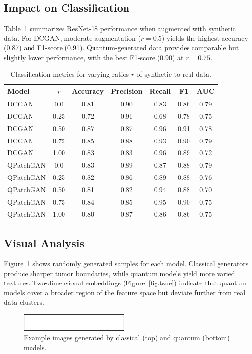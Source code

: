 \documentclass[pdflatex,sn-mathphys-num]{sn-jnl}
\theoremstyle{thmstyleone}
\theoremstyle{thmstyletwo}
\theoremstyle{thmstylethree}
\begin{document}
\subsection{Impact on Classification}
Table~\ref{tab:classification} summarizes ResNet-18 performance when augmented with synthetic data. For DCGAN, moderate augmentation (\(r=0.5\)) yields the highest accuracy (0.87) and F1-score (0.91). Quantum-generated data provides comparable but slightly lower performance, with the best F1-score (0.90) at \(r=0.75\).

\begin{table}[ht]
\caption{Classification metrics for varying ratios \(r\) of synthetic to real data.}
\centering
\begin{tabular}{lcccccc}
\toprule
Model & \(r\) & Accuracy & Precision & Recall & F1 & AUC \\
\midrule
DCGAN & 0.0 & 0.81 & 0.90 & 0.83 & 0.86 & 0.79 \\
DCGAN & 0.25 & 0.72 & 0.91 & 0.68 & 0.78 & 0.75 \\
DCGAN & 0.50 & 0.87 & 0.87 & 0.96 & 0.91 & 0.78 \\
DCGAN & 0.75 & 0.85 & 0.88 & 0.93 & 0.90 & 0.79 \\
DCGAN & 1.00 & 0.83 & 0.83 & 0.96 & 0.89 & 0.72 \\
QPatchGAN & 0.0 & 0.83 & 0.89 & 0.87 & 0.88 & 0.79 \\
QPatchGAN & 0.25 & 0.82 & 0.86 & 0.89 & 0.88 & 0.76 \\
QPatchGAN & 0.50 & 0.81 & 0.82 & 0.94 & 0.88 & 0.70 \\
QPatchGAN & 0.75 & 0.84 & 0.85 & 0.95 & 0.90 & 0.75 \\
QPatchGAN & 1.00 & 0.80 & 0.87 & 0.86 & 0.86 & 0.75 \\
\bottomrule
\end{tabular}
\label{tab:classification}
\end{table}

\subsection{Visual Analysis}
Figure~\ref{fig:grid} shows randomly generated samples for each model. Classical generators produce sharper tumor boundaries, while quantum models yield more varied textures. Two-dimensional embeddings (Figure~\ref{fig:tsne}) indicate that quantum models cover a broader region of the feature space but deviate further from real data clusters.

\begin{figure}[ht]
\centering
\includegraphics[width=0.48\textwidth]{fig.eps}
\caption{Example images generated by classical (top) and quantum (bottom) models.}
\label{fig:grid}
\end{figure}
\end{document}
